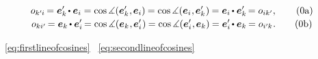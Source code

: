\nopagebreak\vspace{-0.2em}\en{\vspace{-0.3em}}
\begin{gather*}
\cosinematrix{k'\hspace{-0.1ex}i} \hspace{-0.2ex}
= \bm{e}'_{k} \hspace{-0.2ex} \dotp \bm{e}_i
= \cosine \measuredangle (
    \bm{e}'_{k}
    \hspace{.1ex} , \hspace{-0.1ex}
    \bm{e}_i
) \hspace{-0.1ex}
= \cosine \measuredangle (
    \bm{e}_{i}
    \hspace{.1ex} , \hspace{-0.1ex}
    \bm{e}'_{k}
\hspace{.1ex}) \hspace{-0.1ex}
= \bm{e}_{i} \hspace{-0.15ex} \dotp \bm{e}'_k \hspace{-0.25ex}
= \cosinematrix{ik'} ,
\tag{\theequation a}\label{eq:firstlineofcosines}
\\[-0.1em]
%
\cosinematrix{ki'} \hspace{-0.25ex}
= \bm{e}_k \hspace{-0.15ex} \dotp \bm{e}'_{i} \hspace{-0.25ex}
= \cosine \measuredangle (
    \bm{e}_k
    \hspace{.1ex} , \hspace{-0.1ex}
    \bm{e}'_{i}
\hspace{.1ex} ) \hspace{-0.1ex}
= \cosine \measuredangle (
    \bm{e}'_{i}
    \hspace{.1ex} , \hspace{-0.1ex}
    \bm{e}_k
) \hspace{-0.1ex}
= \bm{e}'_{i} \hspace{-0.2ex} \dotp \bm{e}_k \hspace{-0.2ex}
= \cosinematrix{i'\hspace{-0.1ex}k}
\hspace{.1ex} .
\tag{\theequation b}\label{eq:secondlineofcosines}
\end{gather*}

\noindent
{}~\eqref{eq:firstlineofcosines}
~\eqref{eq:secondlineofcosines}


